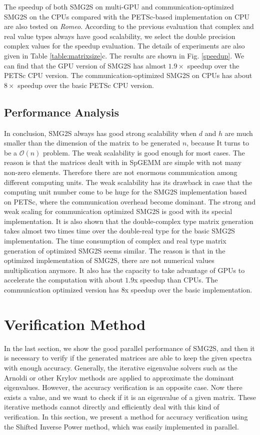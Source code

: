 The speedup of both SMG2S on multi-GPU and communication-optimized SMG2S on the CPUs compared with the PETSc-based implementation on CPU are also tested on \textit{Romeo}. According to the previous evaluation that complex and real value types always have good scalability, we select the double precision complex values for the speedup evaluation. The details of experiments are also given in Table \ref{table:matrixsize}c. The results are shown in Fig. \ref{speedup}. We can find that the GPU version of SMG2S has almost $1.9\times$ speedup over the PETSc CPU version. The communication-optimized SMG2S on CPUs has about $8\times$ speedup over the basic PETSc CPU version.

\subsection{Performance Analysis}

In conclusion, SMG2S always has good strong scalability when $d$ and $h$ are much smaller than the dimension of the matrix to be generated $n$, because It turns to be a $\mathcal{O}(n)$ problem. The weak scalability is good enough for most cases. The reason is that the matrices dealt with in SpGEMM are simple with not many non-zero elements. Therefore there are not enormous communication among different computing units. The weak scalability has its drawback in case that the computing unit number come to be huge for the SMG2S implementation based on PETSc, where the communication overhead become dominant. The strong and weak scaling for communication optimized SMG2S is good with its special implementation. It is also shown that the double-complex type matrix generation takes almost two times time over the double-real type for the basic SMG2S implementation. The time consumption of complex and real type matrix generation of optimized SMG2S seems similar. The reason is that in the optimized implementation of SMG2S, there are not numerical values multiplication anymore.  It also has the capacity to take advantage of GPUs to accelerate the computation with about $1.9$x speedup than CPUs. The communication optimized version has $8$x speedup over the basic implementation.

\section{Verification Method}

In the last section, we show the good parallel performance of SMG2S, and then it is necessary to verify if the generated matrices are able to keep the given spectra with enough accuracy. Generally, the iterative eigenvalue solvers such as the Arnoldi or other Krylov methods \cite{petiton1992parallel} are applied to approximate the dominant eigenvalues. However, the accuracy verification is an opposite case. Now there exists a value, and we want to check if it is an eigenvalue of a given matrix. These iterative methods cannot directly and efficiently deal with this kind of verification. In this section, we present a method for accuracy verification using the Shifted Inverse Power method, which was easily implemented in parallel.

